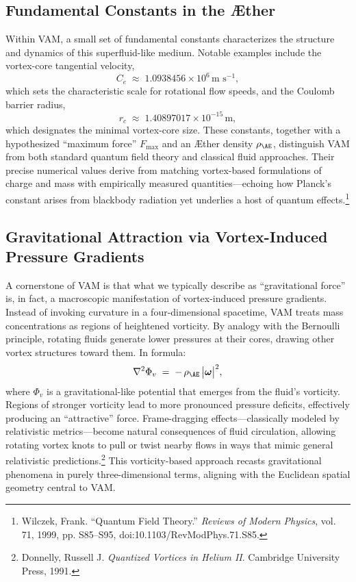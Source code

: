 \documentclass[aps,preprint,superscriptaddress]{revtex4-2}
\begin{document}
    \subsection{Fundamental Constants in the Æther}

    Within VAM, a small set of fundamental constants characterizes the structure and dynamics of this superfluid-like medium. Notable examples include the vortex-core tangential velocity,
    \[
        C_{e} \;\approx\; 1.0938456 \times 10^{6} \, \text{m s}^{-1},
    \]
    which sets the characteristic scale for rotational flow speeds, and the Coulomb barrier radius,
    \[
        r_{c} \;\approx\; 1.40897017 \times 10^{-15} \, \text{m},
    \]
    which designates the minimal vortex-core size. These constants, together with a hypothesized “maximum force” \(F_{\text{max}}\) and an Æther density \(\rho_{\mathrm{\AE}}\), distinguish VAM from both standard quantum field theory and classical fluid approaches. Their precise numerical values derive from matching vortex-based formulations of charge and mass with empirically measured quantities—echoing how Planck’s constant arises from blackbody radiation yet underlies a host of quantum effects.\footnote{Wilczek, Frank. “Quantum Field Theory.” \textit{Reviews of Modern Physics}, vol. 71, 1999, pp. S85–S95, doi:10.1103/RevModPhys.71.S85.}

    \subsection{Gravitational Attraction via Vortex-Induced Pressure Gradients}

    A cornerstone of VAM is that what we typically describe as “gravitational force” is, in fact, a macroscopic manifestation of vortex-induced pressure gradients. Instead of invoking curvature in a four-dimensional spacetime, VAM treats mass concentrations as regions of heightened vorticity. By analogy with the Bernoulli principle, rotating fluids generate lower pressures at their cores, drawing other vortex structures toward them. In formula:
    \[
        \nabla^2 \Phi_{v} \;=\; -\,\rho_{\mathrm{\AE}} \,\bigl|\boldsymbol{\omega}\bigr|^{2},
    \]
    where \(\Phi_{v}\) is a gravitational-like potential that emerges from the fluid’s vorticity. Regions of stronger vorticity lead to more pronounced pressure deficits, effectively producing an “attractive” force. Frame-dragging effects—classically modeled by relativistic metrics—become natural consequences of fluid circulation, allowing rotating vortex knots to pull or twist nearby flows in ways that mimic general relativistic predictions.\footnote{Donnelly, Russell J. \textit{Quantized Vortices in Helium II}. Cambridge University Press, 1991.} This vorticity-based approach recasts gravitational phenomena in purely three-dimensional terms, aligning with the Euclidean spatial geometry central to VAM.
\end{document}
